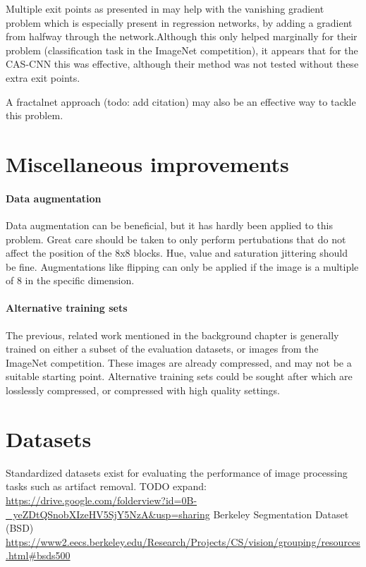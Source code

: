 Multiple exit points as presented in \cite{googlenet} may help with the vanishing gradient problem which is especially present in regression networks, by adding a gradient from halfway through the network.Although this only helped marginally for their problem (classification task in the ImageNet competition), it appears that for the CAS-CNN \cite{CavigelliHB16} this was effective, although their method was not tested without these extra exit points.

A fractalnet approach (todo: add citation) may also be an effective way to tackle this problem.

\section{Miscellaneous improvements}

\paragraph{Data augmentation} Data augmentation can be beneficial, but it has hardly been applied to this problem. Great care should be taken to only perform pertubations that do not affect the position of the 8x8 blocks. Hue, value and saturation jittering should be fine. Augmentations like flipping can only be applied if the image is a multiple of 8 in the specific dimension.

\paragraph{Alternative training sets}
The previous, related work mentioned in the background chapter is generally trained on either a subset of the evaluation datasets, or images from the ImageNet competition. These images are already compressed, and may not be a suitable starting point. Alternative training sets could be sought after which are losslessly compressed, or compressed with high quality settings.


\section{Datasets}
Standardized datasets exist for evaluating the performance of image processing tasks such as artifact removal. TODO expand:
\url{https://drive.google.com/folderview?id=0B-_yeZDtQSnobXIzeHV5SjY5NzA&usp=sharing}
Berkeley Segmentation Dataset (BSD) \url{https://www2.eecs.berkeley.edu/Research/Projects/CS/vision/grouping/resources.html#bsds500}

